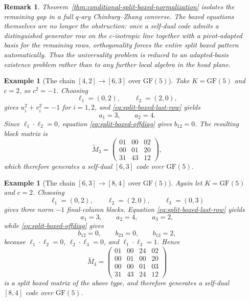 \documentclass[12pt]{article}
\newtheorem{example}[theorem]{Example}
\newtheorem{remark}[theorem]{Remark}
\newcommand{\GF}[1]{\ensuremath{\mathrm{GF}(#1)}}
\begin{document}
\begin{remark}
\rm
Theorem~\ref{thm:conditional-split-boxed-normalization} isolates the remaining gap in a full \(q\)-ary Chinburg--Zhang converse. The boxed equations themselves are no longer the obstruction: once a self-dual code admits a distinguished generator row on the \(c\)-isotropic line together with a pivot-adapted basis for the remaining rows, orthogonality forces the entire split boxed pattern automatically. Thus the universality problem is reduced to an adapted-basis existence problem rather than to any further local algebra in the head plane.
\end{remark}

{\color{red}{Question1. What is the difference between Theorem 4.7 and Theorem 4.8? \\
Question 2: Need LEAN proof for Theorem 4.7 or Theorem 4.8.}}

\begin{example}[The chain \texorpdfstring{$[4,2]\to[6,3]$}{[4,2] to [6,3]} over \texorpdfstring{$\GF{5}$}{GF(5)}]
\label{ex:split-boxed-63}
Take \(K=\GF{5}\) and \(c=2\), so \(c^2=-1\). Choosing
\[
\ell_1=(0,2),\qquad \ell_2=(2,0),
\]
gives \(u_i^2+v_i^2=-1\) for \(i=1,2\), and \eqref{eq:split-boxed-last-row} yields
\[
a_1=3,\qquad a_2=4.
\]
Since \(\ell_1\cdot\ell_2=0\), equation \eqref{eq:split-boxed-offdiag} gives \(b_{12}=0\). The resulting block matrix is
\[
\widetilde M_3=
\begin{pmatrix}
01 & 00 & 02\\
00 & 01 & 20\\
31 & 43 & 12
\end{pmatrix},
\]
which therefore generates a self-dual \([6,3]\) code over \(\GF{5}\).
\end{example}

\begin{example}[The chain \texorpdfstring{$[6,3]\to[8,4]$}{[6,3] to [8,4]} over \texorpdfstring{$\GF{5}$}{GF(5)}]
\label{ex:split-boxed-84}
Again let \(K=\GF{5}\) and \(c=2\). Choosing
\[
\ell_1=(0,2),\qquad \ell_2=(2,0),\qquad \ell_3=(0,3)
\]
gives three norm \(-1\) final-column blocks. Equation \eqref{eq:split-boxed-last-row} yields
\[
a_1=3,\qquad a_2=4,\qquad a_3=2,
\]
while \eqref{eq:split-boxed-offdiag} gives
\[
b_{12}=0,\qquad b_{23}=0,\qquad b_{13}=2,
\]
because \(\ell_1\cdot\ell_2=0\), \(\ell_2\cdot\ell_3=0\), and \(\ell_1\cdot\ell_3=1\). Hence
\[
\widetilde M_4=
\begin{pmatrix}
01 & 00 & 24 & 02\\
00 & 01 & 00 & 20\\
00 & 00 & 01 & 03\\
31 & 43 & 24 & 12
\end{pmatrix}
\]
is a split boxed matrix of the above type, and therefore generates a self-dual \([8,4]\) code over \(\GF{5}\).
\end{example}
\end{document}
